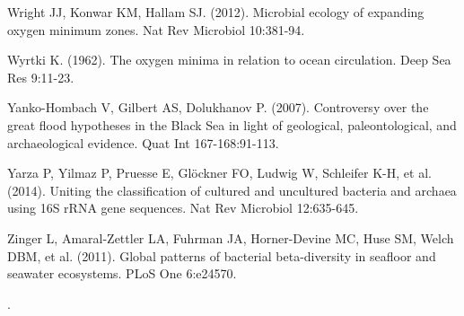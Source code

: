 Wright JJ, Konwar KM, Hallam SJ. (2012). Microbial ecology of expanding oxygen minimum zones. Nat Rev Microbiol 10:381-94.

Wyrtki K. (1962). The oxygen minima in relation to ocean circulation. Deep Sea Res 9:11-23.

Yanko-Hombach V, Gilbert AS, Dolukhanov P. (2007). Controversy over the great flood hypotheses in the Black Sea in light of geological, paleontological, and archaeological evidence. Quat Int 167-168:91-113.

Yarza P, Yilmaz P, Pruesse E, Gl\"ockner FO, Ludwig W, Schleifer K-H, et al. (2014). Uniting the classification of cultured and uncultured bacteria and archaea using 16S rRNA gene sequences. Nat Rev Microbiol 12:635-645.

Zinger L, Amaral-Zettler LA, Fuhrman JA, Horner-Devine MC, Huse SM, Welch DBM, et al. (2011). Global patterns of bacterial beta-diversity in seafloor and seawater ecosystems. PLoS One 6:e24570. 

\newpage
.
